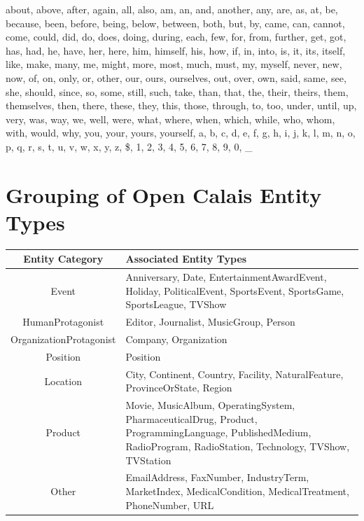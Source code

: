 \documentclass[11pt,a4paper,twoside]{article}
\begin{document}
\begin{appendix}
\bigskip

\noindent about, above, after, again, all, also, am, an, and, another, any, are, as, at, be, because, been, before, being, below, between, both, but, by, came, can, cannot, come, could, did, do, does, doing, during, each, few, for, from, further, get, got, has, had, he, have, her, here, him, himself, his, how, if, in, into, is, it, its, itself, like, make, many, me, might, more, most, much, must, my, myself, never, new, now, of, on, only, or, other, our, ours, ourselves, out, over, own, said, same, see, she, should, since, so, some, still, such, take, than, that, the, their, theirs, them, themselves, then, there, these, they, this, those, through, to, too, under, until, up, very, was, way, we, well, were, what, where, when, which, while, who, whom, with, would, why, you, your, yours, yourself, a, b, c, d, e, f, g, h, i, j, k, l, m, n, o, p, q, r, s, t, u, v, w, x, y, z, \$, 1, 2, 3, 4, 5, 6, 7, 8, 9, 0, \_

\clearpage

\section{Grouping of Open Calais Entity Types} \label{AppendixEntcats}

\begin{table}[h!]
    \centering
    \begin{tabular}{|c|p{10cm}|}
        \hline
        \textbf{Entity Category}& \textbf{Associated Entity Types} \\
        \hline
        Event                   & \nohyphens{Anniversary, Date, EntertainmentAwardEvent, Holiday, PoliticalEvent, SportsEvent, SportsGame, SportsLeague, TVShow} \\
        \hline
        HumanProtagonist        & Editor, Journalist, MusicGroup, Person \\
        \hline
        OrganizationProtagonist & Company, Organization \\
        \hline
        Position                & Position \\
        \hline
        Location                & \nohyphens{City, Continent, Country, Facility, NaturalFeature, ProvinceOrState, Region} \\
        \hline
        Product                 & \nohyphens{Movie, MusicAlbum, OperatingSystem, PharmaceuticalDrug, Product, ProgrammingLanguage, PublishedMedium, RadioProgram, RadioStation, Technology, TVShow, TVStation} \\
        \hline
        Other                   & \nohyphens{EmailAddress, FaxNumber, IndustryTerm, MarketIndex, MedicalCondition, MedicalTreatment, PhoneNumber, URL} \\
        \hline
    \end{tabular}
    \label{table:entity-groups}
\end{table}

\end{appendix}
\end{document}
